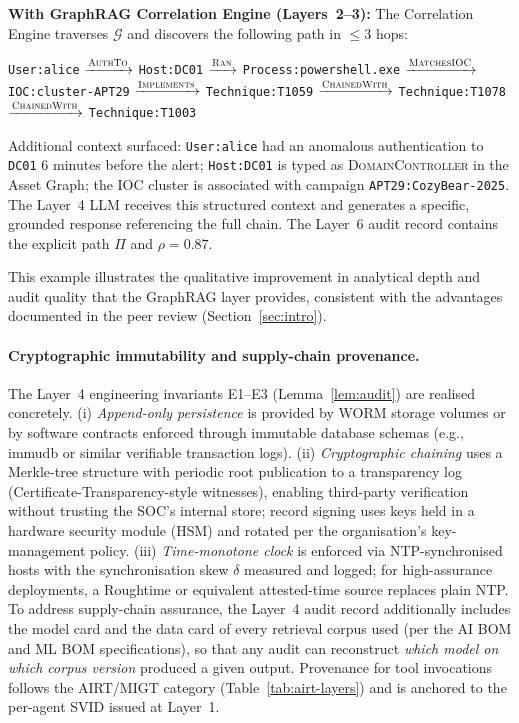 \documentclass[preprint,12pt,authoryear]{elsarticle}
\begin{document}
\noindent\textbf{With GraphRAG Correlation Engine (Layers~2--3):}
The Correlation Engine traverses $\mathcal{G}$ and discovers the following path
in $\leq 3$ hops:
\begin{center}
\texttt{User:alice} $\xrightarrow{\textsc{AuthTo}}$
\texttt{Host:DC01} $\xrightarrow{\textsc{Ran}}$
\texttt{Process:powershell.exe} $\xrightarrow{\textsc{MatchesIOC}}$
\texttt{IOC:cluster-APT29} $\xrightarrow{\textsc{Implements}}$
\texttt{Technique:T1059} $\xrightarrow{\textsc{ChainedWith}}$
\texttt{Technique:T1078} $\xrightarrow{\textsc{ChainedWith}}$
\texttt{Technique:T1003}
\end{center}
Additional context surfaced: \texttt{User:alice} had an anomalous authentication
to \texttt{DC01} 6 minutes before the alert; \texttt{Host:DC01} is typed as
\textsc{DomainController} in the Asset Graph; the IOC cluster is associated with
campaign \texttt{APT29:CozyBear-2025}.
The Layer~4 LLM receives this structured context and generates a specific,
grounded response referencing the full chain.
The Layer~6 audit record contains the explicit path $\Pi$ and $\rho = 0.87$.

This example illustrates the qualitative improvement in analytical depth
and audit quality that the GraphRAG layer provides, consistent with the
advantages documented in the peer review (Section~\ref{sec:intro}).

\paragraph{Cryptographic immutability and supply-chain provenance.}
The Layer~4 engineering invariants E1--E3 (Lemma~\ref{lem:audit}) are realised concretely. (i) \emph{Append-only persistence} is provided by WORM storage volumes or by software contracts enforced through immutable database schemas (e.g., immudb or similar verifiable transaction logs). (ii) \emph{Cryptographic chaining} uses a Merkle-tree structure with periodic root publication to a transparency log (Certificate-Transparency-style witnesses), enabling third-party verification without trusting the SOC's internal store; record signing uses keys held in a hardware security module (HSM) and rotated per the organisation's key-management policy. (iii) \emph{Time-monotone clock} is enforced via NTP-synchronised hosts with the synchronisation skew $\delta$ measured and logged; for high-assurance deployments, a Roughtime or equivalent attested-time source replaces plain NTP. To address supply-chain assurance, the Layer~4 audit record additionally includes the model card and the data card of every retrieval corpus used (per the AI BOM and ML BOM specifications), so that any audit can reconstruct \emph{which model on which corpus version} produced a given output. Provenance for tool invocations follows the AIRT/MIGT category (Table~\ref{tab:airt-layers}) and is anchored to the per-agent SVID issued at Layer~1.
\end{document}
